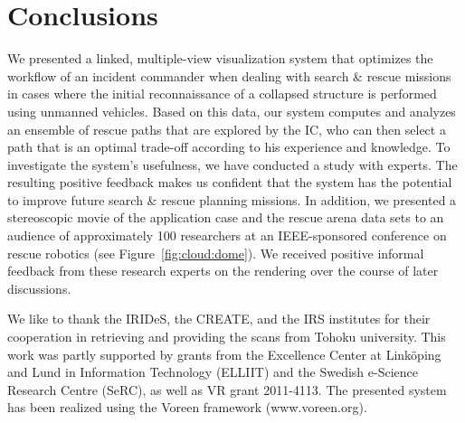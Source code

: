 \documentclass[conference,10pt,letter]{IEEEtran}
\def\IC{IC}
\begin{document}

\section{Conclusions} \label{sec:conclusion}
We presented a linked, multiple-view visualization system that optimizes the workflow of an incident commander when dealing with search \& rescue missions in cases where the initial reconnaissance of a collapsed structure is performed using unmanned vehicles. Based on this data, our system computes and analyzes an ensemble of rescue paths that are explored by the \IC , who can then select a path that is an optimal trade-off according to his experience and knowledge. To investigate the system's usefulness, we have conducted a study with experts. The resulting positive feedback makes us confident that the system has the potential to improve future search \& rescue planning missions. In addition, we presented a stereoscopic movie of the application case and the rescue arena data sets to an audience of approximately 100 researchers at an IEEE-sponsored conference on rescue robotics (see Figure~\ref{fig:cloud:dome}). We received positive informal feedback from these research experts on the rendering over the course of later discussions.




We like to thank the IRIDeS, the CREATE, and the IRS institutes for their cooperation in retrieving and providing the scans from Tohoku university. This work was partly supported by grants from the Excellence Center at Link\"oping and Lund in Information Technology (ELLIIT) and the Swedish e-Science Research Centre (SeRC), as well as VR grant 2011-4113.
The presented system has been realized using the Voreen framework (www.voreen.org).

%
%



\end{document}
